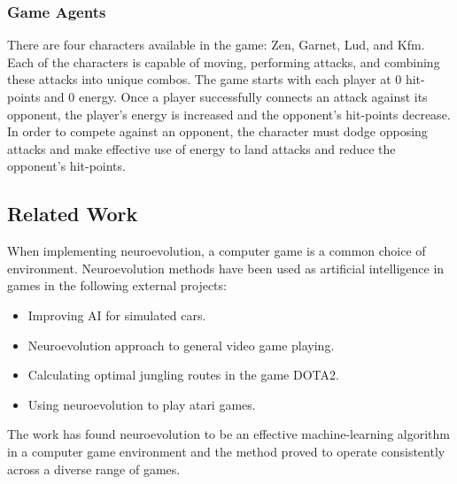 \documentclass[11pt,a4paper]{article}
\begin{document}
\subsubsection{Game Agents}
There are four characters available in the game: Zen, Garnet, Lud, and Kfm. Each of the characters is capable of moving, performing attacks, and combining these attacks into unique combos. The game starts with each player at 0 hit-points and 0 energy. Once a player successfully connects an attack against its opponent, the player's energy is increased and the opponent's hit-points decrease. In order to compete against an opponent, the character must dodge opposing attacks and make effective use of energy to land attacks and reduce the opponent's hit-points.\\
\begin{figure}[h]
\end{figure}
\newpage
\subsection{Related Work}
When implementing neuroevolution, a computer game is a common choice of environment. Neuroevolution methods have been used as artificial intelligence in games in the following external projects:
\begin{itemize}
\item Improving AI for simulated cars. \cite{pace}
\item Neuroevolution approach to general video game playing. \cite{genvid}
\item Calculating optimal jungling routes in the game DOTA2. \cite{dota}
\item Using neuroevolution to play atari games. \cite{atari}
\end{itemize} 
The work has found neuroevolution to be an effective machine-learning algorithm in a computer game environment and the method proved to operate consistently across a diverse range of games.\\
\end{document}
